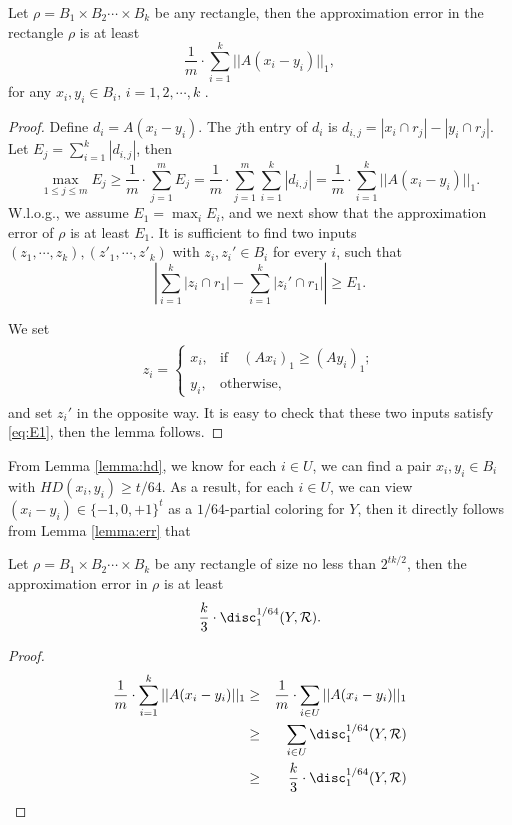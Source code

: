 \begin{lemma}\label{lemma:err}
  Let $\rho=B_1\times B_2\cdots \times B_k$ be any rectangle, then the approximation error
  in the rectangle $\rho$ is at least
$$\frac{1}{m}\cdot\sum_{i=1}^k||A(x_i-y_i)||_1 ,$$
for any $x_i,y_i\in B_i$, $i=1,2,\cdots,k$ .
\end{lemma} 
\begin{proof}
  Define $d_{i}=A(x_i-y_i)$.  The $j$th entry of $d_i$ is $d_{i,j}=|x_i\cap
  r_j|-|y_i\cap r_j|$.  Let $E_j=\sum_{i=1}^k |d_{i,j}|$, then
  $$\max_{1\le j\le m} E_j\ge \frac{1}{m}\cdot \sum_{j=1}^m E_j=
  \frac{1}{m}\cdot\sum_{j=1}^m \sum_{i=1}^k
  |d_{i,j}|=\frac{1}{m}\cdot\sum_{i=1}^k||A(x_i-y_i)||_1.$$
  W.l.o.g., we assume
  $E_1=\max_i E_i$, and we next show that the approximation error of $\rho$ is at least
  $E_1$. It is sufficient to find two inputs $(z_1,\cdots, z_k),(z'_1,\cdots, z'_k)$ with
  $z_i, z_i'\in B_i$ for every $i$, such that
\begin{equation}
\left|\sum_{i=1}^k|z_i\cap r_1|-\sum_{i=1}^{k}|z_i'\cap r_1|\right|\ge E_1. \label{eq:E1}
\end{equation}

We set 
\begin{eqnarray*}
\begin{array}{l}
z_i  =  \left\{
  \begin{array}{rl}
   x_i, & \text{if} \quad (Ax_i)_1\ge (Ay_i)_1; \\
   y_i, & \text{otherwise},
  \end{array}
  \right.
\end{array}
\end{eqnarray*}
and set $z_i'$ in the opposite way. It is easy to check that these two inputs satisfy
\eqref{eq:E1}, then the lemma follows.
\end{proof}

From Lemma \ref{lemma:hd}, we know for each $i\in U$, we can find a pair $x_i,y_i\in B_i$ with $HD(x_i,y_i)\ge t/64$. As a result, for each $i\in U$, we can view $(x_i-y_i)\in \{-1,0,+1\}^t$ as a $1/64$-partial coloring for $Y$, then it directly follows from Lemma \ref{lemma:err} that
\begin{corollary}\label{cor1}
  Let $\rho=B_1\times B_2\cdots \times B_k$ be any rectangle of size no less than
  $2^{tk/2}$, then the approximation error in $\rho$ is at least
$$\frac{k}{3}\cdot \disc_1^{1/64}(Y, \mathcal{R}).$$ 
\end{corollary}
\begin{proof}
\begin{eqnarray*}
\frac{1}{m}\cdot\sum_{i=1}^k||A(x_i-y_i)||_1 &\ge& \frac{1}{m}\cdot\sum_{i\in U}||A(x_i-y_i)||_1 \\
&\ge&\sum_{i\in U}\disc_1^{1/64}(Y,\mathcal{R})\\
&\ge& \frac{k}{3}\cdot \disc_1^{1/64}(Y,\mathcal{R})
\end{eqnarray*}
\end{proof}

